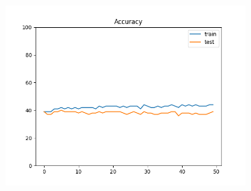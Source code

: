 \documentclass[12pt]{article}
\begin{document}
\begin{figure}
\begin{subfigure}{0.16\textwidth}
    \includegraphics[width=\linewidth]{accuracies_2_2_1.png}
  \end{subfigure}


\end{figure}
\end{document}
